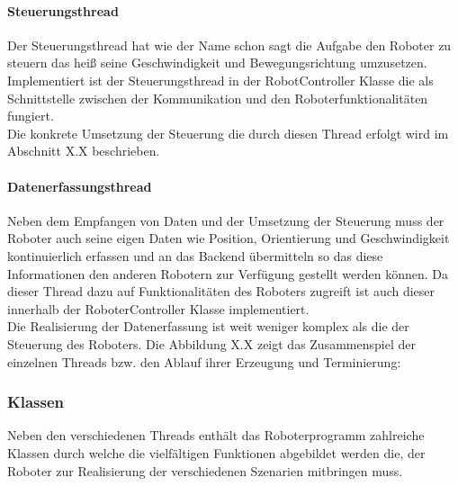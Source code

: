 \paragraph{Steuerungsthread}
Der Steuerungsthread hat wie der Name schon sagt die Aufgabe den Roboter zu steuern das heiß seine Geschwindigkeit und Bewegungsrichtung 
umzusetzen. Implementiert ist der Steuerungsthread in der RobotController Klasse die als Schnittstelle zwischen der Kommunikation und den
Roboterfunktionalitäten fungiert. \\
Die konkrete Umsetzung der Steuerung die durch diesen Thread erfolgt wird im Abschnitt X.X beschrieben.
\paragraph{Datenerfassungsthread}
Neben dem Empfangen von Daten und der Umsetzung der Steuerung muss der Roboter auch seine eigen Daten wie Position, Orientierung und 
Geschwindigkeit kontinuierlich erfassen und an das Backend übermitteln so das diese Informationen den anderen Robotern zur Verfügung
gestellt werden können. Da dieser Thread dazu auf Funktionalitäten des Roboters zugreift ist auch dieser innerhalb der RoboterController
Klasse implementiert.
\\
Die Realisierung der Datenerfassung ist weit weniger komplex als die der Steuerung des Roboters. 
Die Abbildung X.X zeigt das Zusammenspiel der einzelnen Threads bzw. den Ablauf ihrer Erzeugung und Terminierung:
\subsubsection{Klassen}
Neben den verschiedenen Threads enthält das Roboterprogramm zahlreiche Klassen durch welche die vielfältigen Funktionen abgebildet 
werden die, der Roboter zur Realisierung der verschiedenen Szenarien mitbringen muss. 
